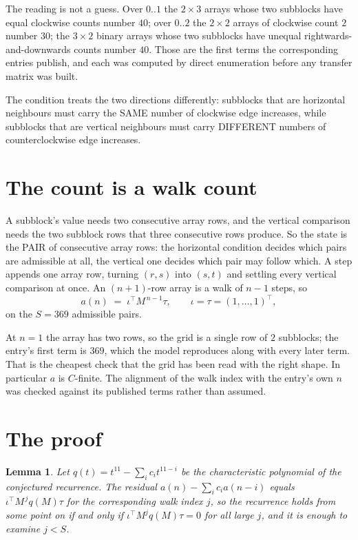 \documentclass[11pt,a4paper]{article}
\theoremstyle{plain}
\newtheorem{lemma}[theorem]{Lemma}
\theoremstyle{definition}
\begin{document}
The reading is not a guess. Over $0..1$ the $2\times3$ arrays whose two subblocks have equal
clockwise counts number $40$; over $0..2$ the $2\times2$ arrays of clockwise count $2$ number
$30$; the $3\times2$ binary arrays whose two subblocks have unequal rightwards-and-downwards
counts number $40$. Those are the first terms the corresponding entries publish, and each was
computed by direct enumeration before any transfer matrix was built.

The condition treats the two directions differently: subblocks that are horizontal neighbours
must carry the SAME number of clockwise edge increases, while subblocks that are vertical neighbours must carry
DIFFERENT numbers of counterclockwise edge increases.

\section{The count is a walk count}

A subblock's value needs two consecutive array rows, and the vertical
comparison needs the two subblock rows that three consecutive rows produce. So the state is the
PAIR of consecutive array rows: the horizontal condition decides which pairs are admissible at
all, the vertical one decides which pair may follow which. A step appends one array row,
turning $(r,s)$ into $(s,t)$ and settling every vertical comparison at once. An $(n+1)$-row
array is a walk of $n-1$ steps, so
\[
a(n)\;=\;\iota^{\!\top}M^{\,n-1}\tau,\qquad\iota=\tau=(1,\dots,1)^{\!\top},
\]
on the $S=369$ admissible pairs.

At $n=1$ the array has two rows, so the grid is a single row of $2$
subblocks; the entry's first term is $369$, which the model
reproduces along with every later term. That is the cheapest check that the grid has been read
with the right shape.
In particular $a$ is $C$-finite. The alignment of the walk index with the entry's own $n$ was
checked against its published terms rather than assumed.

\section{The proof}

\begin{lemma}\label{lem:crit}
Let $q(t)=t^{11}-\sum_i c_it^{11-i}$ be the characteristic polynomial of the
conjectured recurrence. The residual $a(n)-\sum_ic_ia(n-i)$ equals
$\iota^{\!\top}M^{\,j}q(M)\tau$ for the corresponding walk index $j$, so the recurrence
holds from some point on if and only if $\iota^{\!\top}M^{j}q(M)\tau=0$ for all large $j$,
and it is enough to examine $j<S$.
\end{lemma}
\end{document}
